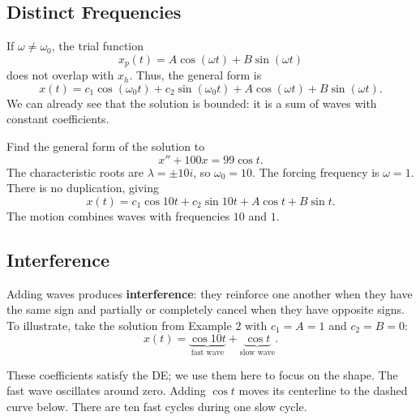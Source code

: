 \documentclass[10pt,letterpaper]{article}
\begin{document}
\subsection{Distinct Frequencies}

If $\omega\ne\omega_0$, the trial function
\[
x_p(t)=A\cos(\omega t)+B\sin(\omega t)
\]
does not overlap with $x_h$. Thus, the general form is
\[
x(t)=c_1\cos(\omega_0t)+c_2\sin(\omega_0t)
+A\cos(\omega t)+B\sin(\omega t).
\]
We can already see that the solution is bounded:
it is a sum of waves with constant coefficients.

\begin{example}[2]{
Find the general form of the solution to
\[
x''+100x=99\cos t.
\]
}
The characteristic roots are $\lambda=\pm10i$, so
$\omega_0=10$. The forcing frequency is $\omega=1$.
There is no duplication, giving
\[
\boxed{
x(t)=c_1\cos10t+c_2\sin10t+A\cos t+B\sin t.
}
\]
The motion combines waves with frequencies $10$ and $1$.
\end{example}

\subsection{Interference}

Adding waves produces \textbf{interference}: they reinforce
one another when they have the same sign and partially
or completely cancel when they have opposite signs. To illustrate, take the solution from Example 2 with
$c_1=A=1$ and $c_2=B=0$:
\[
x(t)=
\underbrace{\cos10t}_{\text{fast wave}}
+
\underbrace{\cos t}_{\text{slow wave}}.
\]

These coefficients satisfy the DE; we use them here
to focus on the shape. The fast wave oscillates around zero. Adding $\cos t$
moves its centerline to the dashed curve below.
There are ten fast cycles during one slow cycle.
\end{document}
